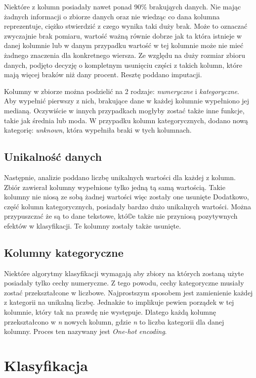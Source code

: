 \documentclass[a4paper,12pt]{article}
\begin{document}
    Niektóre z kolumn posiadały nawet ponad 90\% brakująych danych.
    Nie mając żadnych informacji o zbiorze danych oraz nie wiedząc co dana kolumna reprezentuje, ciężko stwierdzić z czego wynika taki duży brak.
    Może to oznaczać zwyczajnie brak pomiaru, wartość ważną równie dobrze jak ta która istnieje w danej kolumnie lub w danym przypadku wartość w tej kolumnie może nie mieć żadnego znaczenia dla konkretnego wiersza.
    Ze względu na duży rozmiar zbioru danych, podjęto decyzję o kompletnym usunięciu części z takich kolumn, które mają więcej braków niż dany procent.
    Resztę poddano imputacji.

    Kolumny w zbiorze można podzielić na 2 rodzaje: \textit{numeryczne} i \textit{kategoryczne}.
    Aby wypełnić pierwszy z nich, brakujące dane w każdej kolumnie wypełniono jej medianą.
    Oczywiście w innych przypadkach mogłyby zostać także inne funkcje, takie jak średnia lub moda.
    W przypadku kolumn kategorycznych, dodano nową kategorię: \textit{unknown}, która wypełniła braki w tych kolumnach.

    \subsection{Unikalność danych}
    Następnie, analizie poddano liczbę unikalnych wartości dla każdej z kolumn.
    Zbiór zawierał kolumny wypełnione tylko jedną tą samą wartością.
    Takie kolumny nie niosą ze sobą żadnej wartości więc zostały one usunięte
    Dodatkowo, część kolumn kategorycznych, posiadały bardzo dużo unikalnych wartości.
    Można przypuszczać że są to dane tekstowe, któ©e także nie przyniosą pozytywnych efektów w klasyfikacji.
    Te kolumny zostały także usunięte.

    \subsection{Kolumny kategoryczne}
    Niektóre algorytmy klasyfikacji wymagają aby zbiory na których zostaną użyte posiadały tylko cechy numeryczne.
    Z tego powodu, cechy kategoryczne musiały zostać przekształcone w liczbowe.
    Najprostszym sposobem jest zamienienie każdej z kategorii na unikalną liczbę.
    Jednakże to implikuje pewien porządek w tej kolumnie, który tak na prawdę nie występuje.
    Dlatego każdą kolumnę przekształcono w \textit{n} nowych kolumn, gdzie \textit{n} to liczba kategorii dla danej kolumny.
    Proces ten nazywany jest \textit{One-hot encoding}.

    \section{Klasyfikacja}
\end{document}
